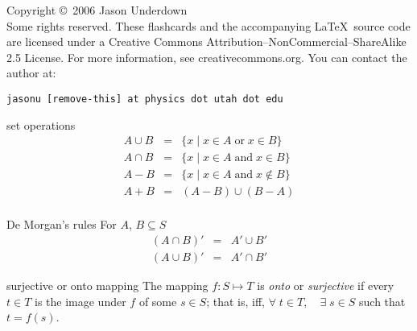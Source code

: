 \documentclass[avery5371,grid]{flashcards}
\begin{document}


\begin{flashcard}{Copyright \copyright \, 2006 Jason Underdown \\
Some rights reserved.}
These flashcards and the accompanying \LaTeX \, source code are licensed
under a Creative Commons Attribution--NonCommercial--ShareAlike 2.5 License.  
For more information, see creativecommons.org.  You can contact the author at:
\begin{center}
\begin{small}\tt jasonu [remove-this] at physics dot utah dot edu\end{small}
\end{center}
\end{flashcard}

\begin{flashcard}[Definition]{set operations}
\begin{eqnarray*}
A \cup B &=& \lbrace x\mid x\in A \;\textrm{or}\; x\in B\rbrace \\
A \cap B &=& \lbrace x\mid x\in A \;\textrm{and}\; x\in B\rbrace \\
A - B &=& \lbrace x\mid x\in A \;\textrm{and}\; x\not\in B\rbrace \\
A + B &=& (A-B) \cup (B-A)\\ 
\end{eqnarray*}
\end{flashcard}

\begin{flashcard}[Theorem]{De Morgan's rules}
For $A$, $B \subseteq S$
\begin{eqnarray*}
(A\cap B)' &=& A' \cup B'\\
(A\cup B)' &=& A' \cap B'
\end{eqnarray*}
\end{flashcard}

\begin{flashcard}[Definition]{surjective or onto mapping}
The mapping $f:S \mapsto T$ is \textit{onto} or \textit{surjective} if every 
$t \in T$ is the image under $f$ of some $s \in S$; that is, iff, $\forall \; t \in T, \quad \exists \; s \in S$ such that $t = f(s)$.
\end{flashcard}
\end{document}
